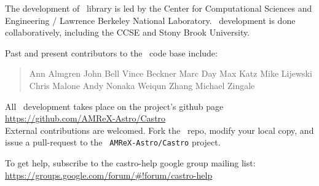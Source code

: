 The development of \amrex\ library is led by the
Center for Computational Sciences and Engineering / Lawrence Berkeley
National Laboratory.  \castro\ development is done collaboratively,
including the CCSE and Stony Brook University.

Past and present contributors to the \castro\ code base include:

\begin{quote}
Ann Almgren\newline
John Bell\newline
Vince Beckner\newline
Marc Day\newline
Max Katz\newline
Mike Lijewski\newline
Chris Malone\newline
Andy Nonaka\newline
Weiqun Zhang\newline
Michael Zingale
\end{quote}

All \castro\ development takes place on the project's github page\\[0.5em]
\url{https://github.com/AMReX-Astro/Castro}\\[0.5em]
External contributions are welcomed.  Fork the \castro\ repo, modify
your local copy, and issue a pull-request to the {\tt
AMReX-Astro/Castro} project.

To get help, subscribe to the castro-help google group mailing list:
\url{https://groups.google.com/forum/#!forum/castro-help}
